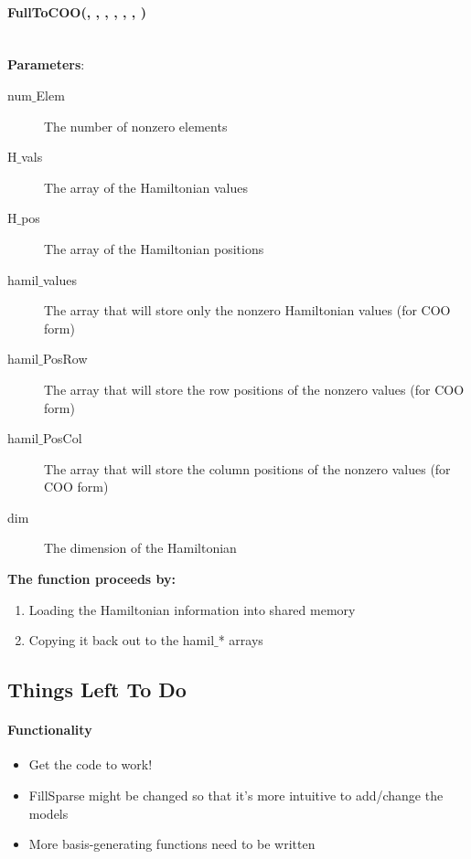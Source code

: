 \documentclass{article}
\begin{document}
\paragraph{\cudaglobal \void FullToCOO(\int , \cuDoubleComplex , \typelongtwoptr , \cuDoubleComplex , \typelongptr , \typelongptr, \long) \\ \\}
\noindent\textbf{Parameters}:
\begin{description}
\item[\int num$\_$Elem] The number of nonzero elements
\item[\cuDoubleComplex H$\_$vals] The array of the Hamiltonian values
\item[\typelongtwoptr H$\_$pos] The array of the Hamiltonian positions
\item[\cuDoubleComplex hamil$\_$values] The array that will store only the nonzero Hamiltonian values (for COO form)
\item[\typelongptr hamil$\_$PosRow] The array that will store the row positions of the nonzero values (for COO form)
\item[\typelongptr hamil$\_$PosCol] The array that will store the column positions of the nonzero values (for COO form)
\item[\long dim] The dimension of the Hamiltonian

\end{description}

\noindent\textbf{The function proceeds by:}
\begin{enumerate}
\item{Loading the Hamiltonian information into shared memory}
\item{Copying it back out to the hamil$\_$* arrays}
\end{enumerate}

\subsection{Things Left To Do}
\paragraph{Functionality}
\begin{itemize}
\item{Get the code to work!}
\item{FillSparse might be changed so that it's more intuitive to add/change the models}
\item{More basis-generating functions need to be written}
\end{itemize}
\end{document}
